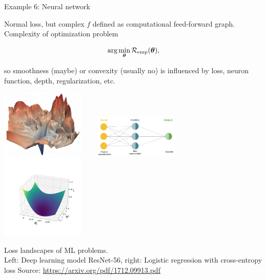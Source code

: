 \documentclass[11pt,compress,t,notes=noshow, xcolor=table]{beamer}
\begin{document}
\begin{vbframe}{Example 6: Neural network}

Normal loss, but complex $f$ defined as computational feed-forward graph. Complexity of optimization problem 

$$
\text{arg} \min_{\bm{\theta}} \mathcal{R}_{\text{emp}}(\bm{\theta}),
$$

so smoothness (maybe) or convexity (usually no) is influenced by loss, neuron function, depth, regularization, etc.

\vspace*{-0.4cm}
\begin{center}
		\includegraphics[width=0.3\textwidth]{figure_man/ml_landscape.jpg} ~~~ \includegraphics[width=0.3\textwidth]{figure_man/newrep_n_f.png} ~~~ \includegraphics[width=0.3\textwidth]{figure_man/log_reg.png} 
	\begin{footnotesize}
		\newline
		Loss landscapes of ML problems. \\ Left: Deep learning model ResNet-56, right: Logistic regression with cross-entropy loss
		\newline
		Source: \url{https://arxiv.org/pdf/1712.09913.pdf}
	\end{footnotesize}
\end{center}	

\end{vbframe}


\endlecture
\end{document}
